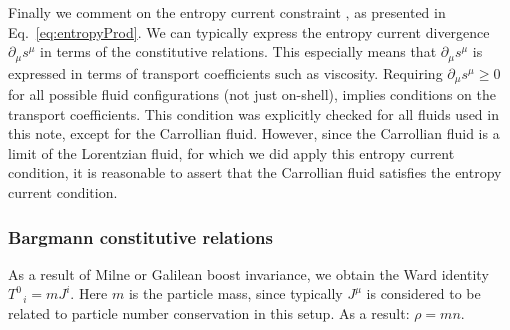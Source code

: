 \documentclass[superscriptaddress,prd,nofootinbib,preprintnumbers,longbibliography,11pt,eqsecnum]{revtex4-1}
\begin{document}
Finally we comment on the entropy current constraint \cite{LLfluid}, as presented in Eq.~\eqref{eq:entropyProd}. We can typically express the entropy current divergence $\partial_{\mu} s^\mu$ in terms of the constitutive relations. This especially means that $ \partial_{\mu} s^\mu$ is expressed in terms of transport coefficients such as viscosity. Requiring $\partial_{\mu}s^{\mu}\geq0$ for all possible fluid configurations (not just on-shell), implies conditions on the transport coefficients. This condition was explicitly checked for all fluids used in this note, except for the Carrollian fluid. However, since the Carrollian fluid is a limit of the Lorentzian fluid, for which we did apply this entropy current condition, it is reasonable to assert that the Carrollian fluid satisfies the entropy current condition.
\subsubsection{Bargmann constitutive relations}\label{bargmann_const}
As a result of Milne or Galilean boost invariance, we obtain the Ward identity $T^{0}_{\;\;\,i}=m J^{i}$. Here $m$ is the particle mass, since typically $J^{\mu}$ is considered to be related to particle number conservation in this setup. As a result: $\rho=m n$. 
\end{document}
